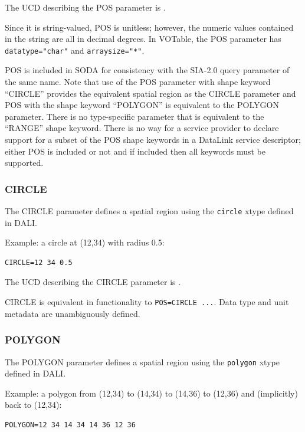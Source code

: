 \documentclass[11pt,a4paper]{ivoa}
\newcommand{\xtype}[1]{\texttt{#1}}
\begin{document}
The UCD  describing the POS parameter is .

Since it is string-valued, POS is unitless; however, the numeric values
contained in the string are all in decimal degrees. In VOTable, the
POS parameter has \verb|datatype="char"| and \verb|arraysize="*"|.



POS is included in SODA  for consistency with the SIA-2.0
 query parameter of the same name. Note that use of the
POS parameter with shape keyword ``CIRCLE'' provides the equivalent
spatial region as the CIRCLE parameter and POS with the shape keyword
``POLYGON'' is equivalent to the POLYGON parameter. There is no
type-specific parameter that is equivalent to the ``RANGE'' shape
keyword. There is no way for a service provider to declare support for a
subset of the POS shape keywords in a DataLink
service descriptor; either POS is included or not and if included then
all keywords must be supported.

\subsubsection{CIRCLE} 
\label{sec:CIRCLE}

The CIRCLE parameter defines a spatial region using the \xtype{circle}
xtype defined in DALI.

Example: a circle at (12,34) with radius 0.5:

\begin{lstlisting}
CIRCLE=12 34 0.5
\end{lstlisting}

The UCD describing the CIRCLE parameter is
.

CIRCLE is equivalent in functionality  to \texttt{POS=CIRCLE ...}.  Data type  and unit metadata are unambiguously defined.

\subsubsection{POLYGON}
\label{sec:POLYGON}

The POLYGON parameter defines a spatial region using the \xtype{polygon}
xtype defined in DALI.

Example: a  polygon from (12,34) to (14,34) to (14,36) to (12,36) and
(implicitly) back to (12,34):

\begin{lstlisting}
POLYGON=12 34 14 34 14 36 12 36
\end{lstlisting}
\end{document}
